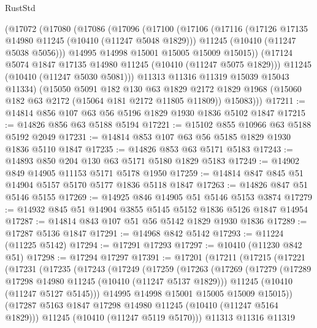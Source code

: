 \begin{lexlean}{RustStd}
\begin{coremodule}
    (@17072
      (@17080
        (@17086
          (@17096
            (@17100
              (@17106
                (@17116
                  (@17126 @17135 @14980 @11245 (@10410 (@11247 @5048 @1829)))
                  @11245
                  (@10410 (@11247 @5038 @5056)))
                @14995
                @14998
                @15001
                @15005
                @15009
                @15015))
            (@17124 @5074 @1847 @17135 @14980 @11245 (@10410 (@11247 @5075 @1829)))
            @11245
            (@10410 (@11247 @5030 @5081)))
          @11313
          @11316
          @11319
          @15039
          @15043
          @11334)
        (@15050
          @5091
          @182
          @130
          @63
          @1829
          @2172
          @1829
          @1968
          (@15060 @182 @63 @2172 (@15064 @181 @2172 @11805 @11809))
          @15083)))
@17211 := @14814 @856 @107 @63 @56 @5196 @1829 @1930 @1836 @5102 @1847
@17215 := @14826 @856 @63 @5188 @5194
@17221 := @15102 @855 @10966 @63 @5188 @5192 @2049
@17231 := @14814 @853 @107 @63 @56 @5185 @1829 @1930 @1836 @5110 @1847
@17235 := @14826 @853 @63 @5171 @5183
@17243 := @14893 @850 @204 @130 @63 @5171 @5180 @1829 @5183
@17249 := @14902 @849 @14905 @11153 @5171 @5178 @1950
@17259 := @14814 @847 @845 @51 @14904 @5157 @5170 @5177 @1836 @5118 @1847
@17263 := @14826 @847 @51 @5146 @5155
@17269 := @14925 @846 @14905 @51 @5146 @5153 @3874
@17279 := @14932 @845 @51 @14904 @3855 @5145 @5152 @1836 @5126 @1847 @14954
@17287 := @14814 @843 @107 @51 @56 @5142 @1829 @1930 @1836
@17289 := @17287 @5136 @1847
@17291 := @14968 @842 @5142
@17293 := @11224 (@11225 @5142)
@17294 := @17291 @17293
@17297 := @10410 (@11230 @842 @51)
@17298 := @17294 @17297
@17391 := @17201
    (@17211
      (@17215
        (@17221
          (@17231
            (@17235
              (@17243
                (@17249
                  (@17259
                    (@17263
                      (@17269
                        (@17279
                          (@17289 @17298 @14980 @11245 (@10410 (@11247 @5137 @1829)))
                          @11245
                          (@10410 (@11247 @5127 @5145)))
                        @14995
                        @14998
                        @15001
                        @15005
                        @15009
                        @15015))
                    (@17287 @5163 @1847 @17298 @14980 @11245 (@10410 (@11247 @5164 @1829)))
                    @11245
                    (@10410 (@11247 @5119 @5170)))
                  @11313
                  @11316
                  @11319

\end{coremodule}
\end{lexlean}
